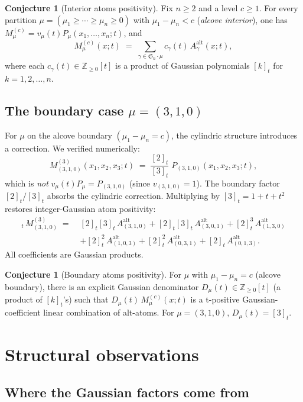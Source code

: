 \documentclass[11pt]{article}
\theoremstyle{definition}
\newtheorem{conjecture}[theorem]{Conjecture}
\newcommand{\gauss}[1]{[#1]_t}
\newcommand{\Aalt}{A^{\mathrm{alt}}}
\newcommand{\Cmu}{M^{(c)}_{\mu}}
\newcommand{\ZZ}{\mathbb{Z}}
\begin{document}
\begin{conjecture}[Interior atoms positivity]
\label{conj:interior}
Fix $n\ge 2$ and a level $c\ge 1$. For every partition $\mu=(\mu_1\ge \cdots\ge\mu_n\ge 0)$ with
$\mu_1-\mu_n<c$ (\emph{alcove interior}), one has $\Cmu = v_\mu(t)P_\mu(x_1,\dots,x_n;t)$, and
\[
   \Cmu(x;t) \;=\; \sum_{\gamma\in\mathfrak{S}_n\cdot\mu} c_\gamma(t)\,\Aalt_\gamma(x;t),
\]
where each $c_\gamma(t) \in \ZZ_{\ge 0}[t]$ is a product of Gaussian polynomials $\gauss{k}$
for $k=1,2,\dots,n$.
\end{conjecture}

\subsection{The boundary case $\mu=(3,1,0)$}

For $\mu$ on the alcove boundary $(\mu_1-\mu_n = c)$, the cylindric structure introduces a
correction. We verified numerically:
\[
   M^{(3)}_{(3,1,0)}(x_1,x_2,x_3;t) \;=\; \frac{\gauss{2}}{\gauss{3}}\; P_{(3,1,0)}(x_1,x_2,x_3;t),
\]
which is \emph{not} $v_\mu(t)P_\mu = P_{(3,1,0)}$ (since $v_{(3,1,0)}=1$). The boundary factor
$\gauss{2}/\gauss{3}$ absorbs the cylindric correction. Multiplying by $\gauss{3}=1+t+t^2$
restores integer-Gaussian atom positivity:
\begin{align*}
   \gauss{3}\,M^{(3)}_{(3,1,0)} \;=\;{}&
     \gauss{2}\gauss{3}\,\Aalt_{(3,1,0)}
   + \gauss{2}\gauss{3}\,\Aalt_{(3,0,1)}
   + \gauss{2}^{3}\,\Aalt_{(1,3,0)} \\
   {}&+\gauss{2}^{2}\,\Aalt_{(1,0,3)}
   + \gauss{2}^{2}\,\Aalt_{(0,3,1)}
   + \gauss{2}\,\Aalt_{(0,1,3)}.
\end{align*}
All coefficients are Gaussian products.

\begin{conjecture}[Boundary atoms positivity]
\label{conj:boundary}
For $\mu$ with $\mu_1-\mu_n=c$ (alcove boundary), there is an explicit Gaussian
denominator $D_\mu(t)\in\ZZ_{\ge 0}[t]$ (a product of $\gauss{k}$'s) such that
$D_\mu(t)\,\Cmu(x;t)$ is a t-positive Gaussian-coefficient linear combination of
alt-atoms. For $\mu=(3,1,0)$, $D_\mu(t)=\gauss{3}$.
\end{conjecture}

\section{Structural observations}

\subsection{Where the Gaussian factors come from}
\end{document}
